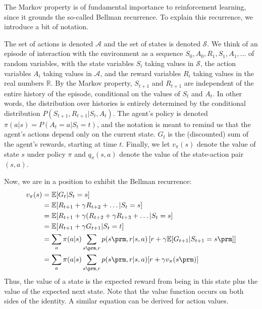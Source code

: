 The Markov property is of fundamental importance to reinforcement learning, since it grounds the so-called Bellman recurrence.
To explain this recurrence, we introduce a bit of notation.

The set of actions is denoted $\mathcal A$ and the set of states is denoted $\mathcal S$.
We think of an episode of interaction with the environment as a sequence $S_0, A_0, R_1, S_1, A_1, \dots$ of random variables, with the state variables $S_i$ taking values in $\mathcal S$, the action variables $A_i$ taking values in $\mathcal A$, and the reward variables $R_i$ taking values in the real numbers $\mathbb R$.
By the Markov property, $S_{t + 1}$ and $R_{t + 1}$ are independent of the entire history of the episode, conditional on the values of $S_{t}$ and $A_{t}$.
In other words, the distribution over histories is entirely determined by the conditional distribution $P(S_{t + 1}, R_{t + 1} | S_t, A_t)$.
The agent's policy is denoted $\pi(a | s) = P(A_t = a | S_t = t)$, and the notation is meant to remind us that the agent's actions depend only on the current state.
$G_t$ is the (discounted) sum of the agent's rewards, starting at time $t$.
Finally, we let $v_\pi (s)$ denote the value of state $s$ under policy $\pi$ and $q_\pi(s, a)$ denote the value of the state-action pair $(s, a)$. 

Now, we are in a position to exhibit the Bellman recurrence:
\begin{align*}
	v_\pi(s) 
	&= 
	\mathbb E [G_t	| S_t = s]\\
	&= \mathbb E [ R_{t + 1} + \gamma R_{t + 2} + \dots  | S_t = s]\\
	&= \mathbb E [ R_{t + 1} + \gamma (R_{t + 2} + \gamma R_{t + 3} + \dots | S_{t} = s]\\
	&= \mathbb E [R_{t + 1} + \gamma G_{t + 1} | S_t = t]\\
	&= \sum_a \pi(a | s) \sum_{s\prm, r} p(s\prm, r | s, a) \left[r + \gamma \mathbb E [G_{t + 1} | S_{t + 1} = s\prm] \right] \\
	&= \sum_a \pi(a | s) \sum_{s\prm, r} p(s\prm, r | s, a) [r + \gamma v_\pi (s\prm)]
\end{align*}
Thus, the value of a state is the expected reward from being in this state plus the value of the expected next state.
Note that the value function occurs on both sides of the identity.
A similar equation can be derived for action values.

